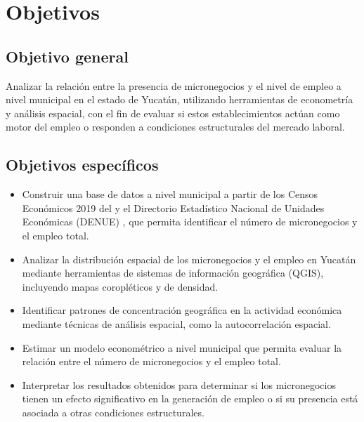 \section{Objetivos}

\subsection{Objetivo general}

Analizar la relación entre la presencia de micronegocios y el nivel de empleo a nivel municipal en el estado de Yucatán, utilizando herramientas de econometría y análisis espacial, con el fin de evaluar si estos establecimientos actúan como motor del empleo o responden a condiciones estructurales del mercado laboral.

\subsection{Objetivos específicos}

\begin{itemize}

\item Construir una base de datos a nivel municipal a partir de los Censos Económicos 2019 del \cite{inegi2019} y el Directorio Estadístico Nacional de Unidades Económicas (DENUE) \cite{denue}, que permita identificar el número de micronegocios y el empleo total.

\item Analizar la distribución espacial de los micronegocios y el empleo en Yucatán mediante herramientas de sistemas de información geográfica (QGIS), incluyendo mapas coropléticos y de densidad.

\item Identificar patrones de concentración geográfica en la actividad económica mediante técnicas de análisis espacial, como la autocorrelación espacial.

\item Estimar un modelo econométrico a nivel municipal que permita evaluar la relación entre el número de micronegocios y el empleo total.

\item Interpretar los resultados obtenidos para determinar si los micronegocios tienen un efecto significativo en la generación de empleo o si su presencia está asociada a otras condiciones estructurales.

\end{itemize}